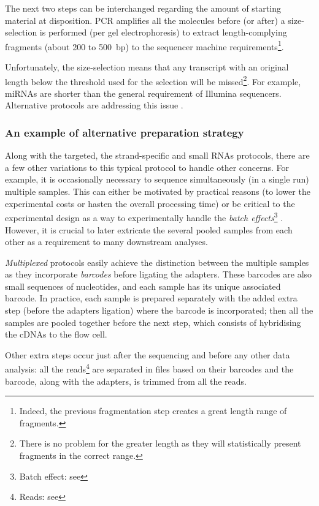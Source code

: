 The next two steps can be interchanged regarding the amount of starting material
at disposition. \gls{PCR} amplifies all the molecules before (or after)
a size-selection is performed (per gel electrophoresis) to extract
length-complying fragments (about 200 to 500\ bp) to the sequencer machine
requirements\footnote{Indeed, the previous fragmentation step creates a great
length range of fragments.}.\mybr\

Unfortunately, the size-selection means that any
transcript with an original length below the threshold used for the
selection will be missed\footnote{There is no problem for the greater length
as they will statistically present fragments in the correct range.}.
For example, \glspl{miRNA} are shorter than the general requirement of Illumina
sequencers. Alternative protocols are addressing this issue
.\mybr\

\subsubsection{An example of alternative preparation strategy}
Along with the targeted, the strand-specific and small \glspl{RNA} protocols,
there are a few other variations to this typical protocol to handle other concerns.
For example, it is occasionally necessary to sequence simultaneously (in a single
run) multiple samples. This can either be motivated by practical reasons
(to lower the experimental costs or hasten the overall processing time)
 or be critical to the experimental design as a way to
experimentally handle the \emph{batch effects}\footnote{Batch effect: see
} . However, it is
crucial to later extricate the several pooled samples from each other as a
requirement to many downstream analyses.\mybr\

\emph{Multiplexed} protocols easily achieve
the distinction between the multiple samples as they incorporate \emph{barcodes}
before ligating the adapters. These barcodes are also small sequences of
nucleotides, and each sample has its unique associated
barcode. In practice, each sample is prepared separately with the added extra
step (before the adapters ligation) where the barcode is incorporated; then all
the samples are pooled together before the next step, which consists of hybridising
the \glspl{cDNA} to the flow cell.\mybr\

Other extra steps occur just after the sequencing and before any other data
analysis: all the reads\footnote{Reads: see } are
separated in files based on their barcodes and the barcode, along with the
adapters, is trimmed from all the reads.\mybr\

